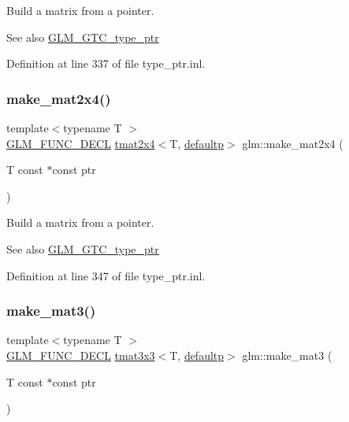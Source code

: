 Build a matrix from a pointer. \begin{DoxySeeAlso}{See also}
\mbox{\hyperlink{group__gtc__type__ptr}{G\+L\+M\+\_\+\+G\+T\+C\+\_\+type\+\_\+ptr}} 
\end{DoxySeeAlso}


Definition at line 337 of file type\+\_\+ptr.\+inl.

\mbox{\label{group__gtc__type__ptr_ga6dfb2ac10859b0cc8e3893ea84fa95b5}} 
\subsubsection{\texorpdfstring{make\_mat2x4()}{make\_mat2x4()}}
{\footnotesize\ttfamily template$<$typename T $>$ \\
\mbox{\hyperlink{setup_8hpp_ab2d052de21a70539923e9bcbf6e83a51}{G\+L\+M\+\_\+\+F\+U\+N\+C\+\_\+\+D\+E\+CL}} \mbox{\hyperlink{structglm_1_1tmat2x4}{tmat2x4}}$<$T, \mbox{\hyperlink{namespaceglm_a0f04f086094c747d227af4425893f545a9d21ccd8b5a009ec7eb7677befc3bf51}{defaultp}}$>$ glm\+::make\+\_\+mat2x4 (\begin{DoxyParamCaption}\item[{T const $\ast$const}]{ptr }\end{DoxyParamCaption})}

Build a matrix from a pointer. \begin{DoxySeeAlso}{See also}
\mbox{\hyperlink{group__gtc__type__ptr}{G\+L\+M\+\_\+\+G\+T\+C\+\_\+type\+\_\+ptr}} 
\end{DoxySeeAlso}


Definition at line 347 of file type\+\_\+ptr.\+inl.

\mbox{\label{group__gtc__type__ptr_gac2bc10c519ffc8db9e24f325f23787ea}} 
\subsubsection{\texorpdfstring{make\_mat3()}{make\_mat3()}}
{\footnotesize\ttfamily template$<$typename T $>$ \\
\mbox{\hyperlink{setup_8hpp_ab2d052de21a70539923e9bcbf6e83a51}{G\+L\+M\+\_\+\+F\+U\+N\+C\+\_\+\+D\+E\+CL}} \mbox{\hyperlink{structglm_1_1tmat3x3}{tmat3x3}}$<$T, \mbox{\hyperlink{namespaceglm_a0f04f086094c747d227af4425893f545a9d21ccd8b5a009ec7eb7677befc3bf51}{defaultp}}$>$ glm\+::make\+\_\+mat3 (\begin{DoxyParamCaption}\item[{T const $\ast$const}]{ptr }\end{DoxyParamCaption})}

